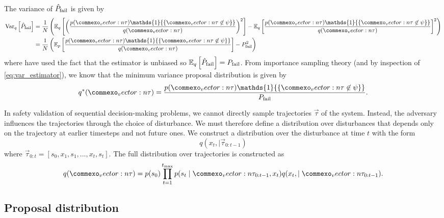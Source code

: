 The variance of $\hat{P}_{\rm fail}$ is given by
\begin{align}
\text{Var}_q\left[ \hat{P}_{\rm fail} \right] &= \frac{1}{N} \left( \mathbb{E}_q \left[\left(\frac{p(\vec{\tau}) \mathds{1}{\{ \vec{\tau} \not \in \psi \}}}{q(\vec{\tau})} \right)^2 \right] - \mathbb{E}_q\left[ \frac{p(\vec{\tau}) \mathds{1}{\{ \vec{\tau} \not \in \psi \}}}{q(\vec{\tau})}  \right]^2 \right) \label{eq:var_estimator}\\
&= \frac{1}{N} \left(\mathbb{E}_p \left[\frac{p(\vec{\tau}) \mathds{1}{\{ \vec{\tau} \not \in \psi \}}}{q(\vec{\tau})} \right] - P_{\rm fail}^2 \right)\label{eq:pfail_variance}
\end{align}
where have used the fact that the estimator is unbiased so $\mathbb{E}_q\left[ \hat{P}_{\rm fail}  \right] = P_{\rm fail}$. From importance sampling theory (and by inspection of \cref{eq:var_estimator}), we know that the minimum variance proposal distribution is given by 
\begin{equation}
    q^*(\vec{\tau}) = \frac{p(\vec{\tau}) \mathds{1}{\{ \vec{\tau} \not \in \psi \}}}{P_{\rm fail}} \text{.}
\end{equation}

In safety validation of sequential decision-making problems, we cannot directly sample trajectories $\vec{\tau}$ of the system. Instead, the adversary influences the trajectories through the choice of disturbance. We must therefore define a distribution over disturbances that depends only on the trajectory at earlier timesteps and not future ones. We construct a distribution over the disturbance at time $t$ with the form
\begin{equation}
    q(x_t, \mid \vec{\tau}_{0:t-1})
\end{equation}
where $\vec{\tau}_{0:t} = [s_0, x_1, s_1, \ldots, x_t, s_t]$. The full distribution over trajectories is constructed as
\begin{equation}
    q(\vec{\tau}) = p(s_0) \prod_{t = 1}^{t_{\rm max}} p(s_t \mid \vec{\tau}_{0:t-1}, x_t) q(x_t, \mid \vec{\tau}_{0:t-1}) \text{.} \label{eq:induced_distribution}
\end{equation}

\subsection{Proposal distribution}

